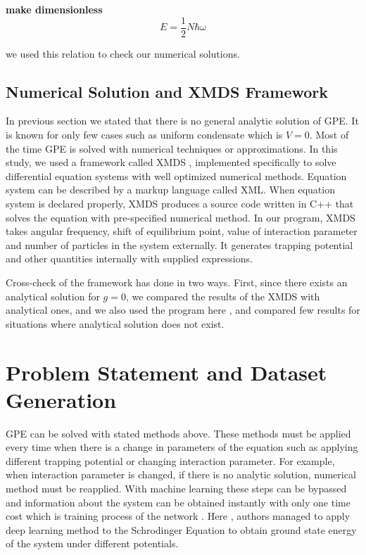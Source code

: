 \documentclass[a4paper,times,12pt]{article}
\begin{document}
\textbf{make dimensionless}
\begin{equation}
\label{eq:GPE_no_inter_GSE}
E = \frac{1}{2}N\hbar\omega
\end{equation}

\noindent we used this relation to check our numerical solutions. 


\subsection{Numerical Solution and XMDS Framework}

In previous section we stated that there is no general analytic solution of GPE. It is known for only few cases such as uniform condensate which is $V = 0$. Most of the time GPE is solved with numerical techniques or approximations. In this study, we used a framework called XMDS \cite{dennis2013xmds2}, implemented specifically to solve differential equation systems with well optimized numerical methods. Equation system can be described by a markup language called XML.  When equation system is declared properly, XMDS produces a source code written in C++ that solves the equation with pre-specified numerical method. In our program, XMDS takes angular frequency, shift of equilibrium point, value of interaction parameter and number of particles in the system externally. It generates trapping potential and other quantities internally with supplied expressions.


Cross-check of the framework has done in two ways. First, since there exists an analytical solution for $g = 0$, we compared the results of the XMDS with analytical ones, and we also used the program here \cite{muruganandam2009fortran}, and compared few results for situations where analytical solution does not exist.  


\section{Problem Statement and Dataset Generation}
\label{sec:Problem statement}

GPE can be solved with stated methods above. These methods must be applied every time when there is a change in parameters of the equation such as applying different trapping potential or changing interaction parameter. For example, when interaction parameter is changed, if there is no analytic solution, numerical method must be reapplied. With machine learning these steps can be bypassed and information about the system can be obtained instantly with only one time cost which is training process of the network \cite{mills2017deep}. Here \cite{mills2017deep}, authors managed to apply deep learning method to the Schrodinger Equation to obtain ground state energy of the system under different potentials. 
\end{document}

